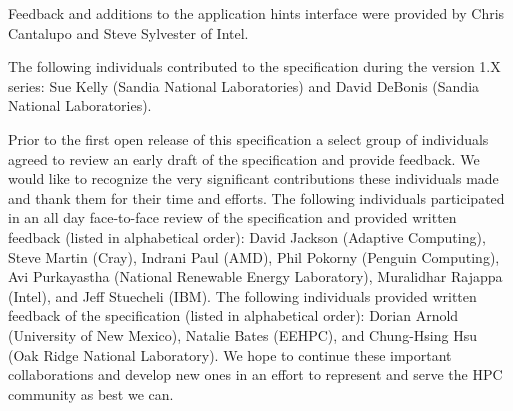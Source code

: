 \documentclass[12pt]{report} %
\providecommand{\DIFdelbegin}{} %
\providecommand{\DIFdelend}{} %
\newcommand{\DIFscaledelfig}{0.5}
\newlength{\DIFdelgraphicswidth} %
\newlength{\DIFdelgraphicsheight} %
\newcommand{\DIFdelincludegraphics}[2][]{%
\sbox{\DIFdelgraphicsbox}{\DIFOincludegraphics[#1]{#2}}%
\settoboxwidth{\DIFdelgraphicswidth}{\DIFdelgraphicsbox} %
\settoboxtotalheight{\DIFdelgraphicsheight}{\DIFdelgraphicsbox} %
\scalebox{\DIFscaledelfig}{%
\parbox[b]{\DIFdelgraphicswidth}{\usebox{\DIFdelgraphicsbox}\\[-\baselineskip] \rule{\DIFdelgraphicswidth}{0em}}\llap{\resizebox{\DIFdelgraphicswidth}{\DIFdelgraphicsheight}{%
\setlength{\unitlength}{\DIFdelgraphicswidth}%
\begin{picture}(1,1)%
\thicklines\linethickness{2pt} %
{\color[rgb]{1,0,0}\put(0,0){\framebox(1,1){}}}%
{\color[rgb]{1,0,0}\put(0,0){\line( 1,1){1}}}%
{\color[rgb]{1,0,0}\put(0,1){\line(1,-1){1}}}%
\end{picture}%
}\hspace*{3pt}}} %
} %
\DeclareRobustCommand{\DIFdelbegin}{\DIFOdelbegin \let\includegraphics\DIFdelincludegraphics} %
\DeclareRobustCommand{\DIFdelend}{\DIFOaddend \let\includegraphics\DIFOincludegraphics} %
\begin{document}
Feedback and additions to the application hints interface were provided by Chris Cantalupo and Steve Sylvester of Intel.

The following individuals contributed to the specification during the version 1.X series: Sue Kelly (Sandia National Laboratories) and David DeBonis (Sandia National Laboratories). 

Prior to the first open release of this specification a select group of individuals agreed to review an early draft of the specification and provide feedback. 
We would like to recognize the very significant contributions these individuals made and thank them for their time and efforts. 
The following individuals participated in an all day face-to-face review of the specification and provided written feedback (listed in alphabetical order): David Jackson (Adaptive Computing), Steve Martin (Cray), Indrani Paul (AMD), Phil Pokorny (Penguin Computing), Avi Purkayastha (National Renewable Energy Laboratory), Muralidhar Rajappa (Intel), and Jeff Stuecheli (IBM).
The following individuals provided written feedback of the specification (listed in alphabetical order): Dorian Arnold (University of New Mexico), Natalie Bates (EEHPC), and Chung-Hsing Hsu (Oak Ridge National Laboratory).
We hope to continue these important collaborations and develop new ones in an effort to represent and serve the HPC community as best we can.



\DIFdelbegin %

    \DIFdelend \tableofcontents

\DIFdelbegin %
\end{document}
